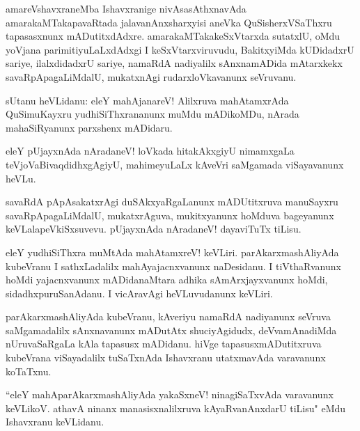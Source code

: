 \documentclass{article}
\begin{document}
\begin{mn}
amareVshavxraneMba Ishavxranige nivAsasAthxnavAda amarakaMTakapavaRtada jalavanAnxsharxyisi
aneVka QuSisherxVSaThxru tapasasxnunx mADutitxdAdxre. amarakaMTakakeSxVtarxda sutatxlU,
oMdu yoVjana parimitiyuLaLxdAdxgi I keSxVtarxviruvudu, BakitxyiMda kUDidadxrU sariye, 
ilalxdidadxrU sariye,  namaRdA nadiyalilx sAnxnamADida mAtarxkekx savaRpApagaLiMdalU, mukatxnAgi
rudarxloVkavanunx seVruvanu.
\end{mn}

\begin{mn}
sUtanu heVLidanu: eleY mahAjanareV! Alilxruva mahAtamxrAda QuSimuKayxru 
yudhiSiThxrananunx muMdu mADikoMDu, nArada mahaSiRyanunx parxshenx mADidaru.
\end{mn}

\begin{mn}
eleY pUjayxnAda nAradaneV! loVkada hitakAkxgiyU nimamxgaLa teVjoVaBivaqdidhxgAgiyU, mahimeyuLaLx
kAveVri saMgamada viSayavanunx heVLu.
\end{mn}

\begin{mn}
savaRdA pApAsakatxrAgi duSAkxyaRgaLanunx mADUtitxruva manuSayxru savaRpApagaLiMdalU, mukatxrAguva, 
mukitxyanunx hoMduva bageyanunx keVLalapeVkiSxsuvevu. pUjayxnAda nAradaneV! dayaviTuTx tiLisu.
\end{mn}

\begin{mn}
eleY yudhiSiThxra muMtAda mahAtamxreV! keVLiri. parAkarxmashAliyAda kubeVranu I sathxLadalilx 
mahAyajacnxvanunx naDesidanu. I tiVthaRvanunx hoMdi yajacnxvanunx mADidanaMtara adhika 
sAmArxjayxvanunx hoMdi, sidadhxpuruSanAdanu. I vicAravAgi 
heVLuvudanunx keVLiri.
\end{mn}

\begin{mn}
parAkarxmashAliyAda kubeVranu, kAveriyu  namaRdA nadiyanunx seVruva saMgamadalilx sAnxnavanunx 
mADutAtx shuciyAgidudx, deVvamAnadiMda nUruvaSaRgaLa kAla tapasusx mADidanu. hiVge 
tapasusxmADutitxruva  kubeVrana viSayadalilx tuSaTxnAda Ishavxranu utatxmavAda varavanunx koTaTxnu.
\end{mn}

\begin{mn}
``eleY mahAparAkarxmashAliyAda  yakaSxneV! ninagiSaTxvAda varavanunx keVLikoV. athavA ninanx 
manasisxnalilxruva kAyaRvanAnxdarU tiLisu" eMdu Ishavxranu keVLidanu.
\end{mn}
\end{document}
